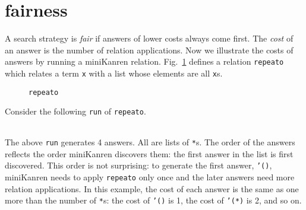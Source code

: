 \documentclass[format=acmlarge, review=true, authordraft=true]{acmart}
\newcommand{\conde}{\texttt{cond$^e$} }
\begin{document}

\section{fairness}

A search strategy is \emph{fair} if answers of lower costs always come first. 
The \emph{cost} of an answer is the number of relation applications. Now we 
illustrate the costs of answers by running a miniKanren relation. 
Fig.~\ref{def-repeato} defines a relation \texttt{repeato} which relates a term 
\texttt{x} with a list whose elements are all \texttt{x}s.


\begin{figure}
  
  \caption{\texttt{repeato}}
  \label{def-repeato}
\end{figure}

Consider the following \texttt{run} of \texttt{repeato}.
\begin{center}
  \begin{tabular}{c}
  
   \end{tabular}
\end{center}

The above \texttt{run} generates 4 answers. All are lists of \texttt{*}s.
The order of the answers reflects the order miniKanren discovers them:
the first answer in the list is first discovered. This order is not surprising:
to generate the first answer, \texttt{'()}, miniKanren needs to apply
\texttt{repeato} only once and the later answers need more relation
applications. In this example, the cost of each answer is the same as
one more than the number of \texttt{*}s: the cost of \texttt{'()} is 1,
the cost of \texttt{'(*)} is 2, and so on.
\end{document}
